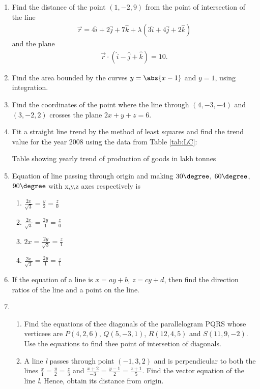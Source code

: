 \begin{enumerate}
	\item Find the distance of the point $(1,-2,9)$ from the point of intersection of the line
		\begin{align}
			\vec{r}=4\hat{i}+2\hat{j}+7\hat{k}+\lambda(3\hat{i}+4\hat{j}+2\hat{k})
		\end{align}and the plane
		\begin{align}
			\vec{r}\cdot(\hat{i}-\hat{j}+\hat{k})=10.
		\end{align}

	\item Find the area bounded by the curves $y=\abs{x-1}$ and $y=1$, using integration.

	\item Find the coordinates of the point where the line through $(4,-3,-4)$ and $(3,-2,2)$ crosses the plane $2x+y+z=6$.

	\item Fit a straight line trend by the method of least squares and find the trend value for the year 2008 using the data from Table \ref{tab:LC}:
		\begin{table}[H]
			\caption{Table showing yearly trend of production of goods in lakh tonnes \label{tab:LC}}
			
		\end{table}

  

  \item Equation of line passing through origin and making $30 \degree $, $60 \degree $, $90 \degree $ with x,y,z axes respectively is
    \begin{enumerate}
        \item $ \frac{2x}{\sqrt{3}}=\frac{y}{2}=\frac{z}{0} $
        \item $  \frac{2x}{\sqrt{3}}=\frac{2y}{1}=\frac{z}{0} $ 
        \item $ 2x=\frac{2y}{\sqrt{3}}=\frac{z}{1} $ 
        \item $  \frac{2x}{\sqrt{3}}=\frac{2y}{1}=\frac{z}{1} $ 
    
    \end{enumerate}
	  \item If the equation of a line is $ x=ay + b$, $z=cy + d$, then find the direction ratios of the line and a point on the line.
	  \item \begin{enumerate}
		    \item Find the equations of thee diagonals of the parallelogram PQRS whose verticees are $P(4, 2, 6)$, $Q(5,  -3, 1)$, $R(12, 4, 5)$ and $S(11, 9, -2)$. Use the equations to find thee point of intersetion of diagonals.
	    \item A line \textit{l} passes through point $(-1, 3, 2)$ and is perpendicular to both the lines $\frac{x}{1} = \frac{y}{2} = \frac{z}{3}$ and $\frac{x+2}{-3} = \frac{y-1}{2} = \frac{z + 1}{5}$. Find the vector equation of the line \textit{l}. Hence, obtain its distance from origin.
          \end{enumerate}
\end{enumerate}
